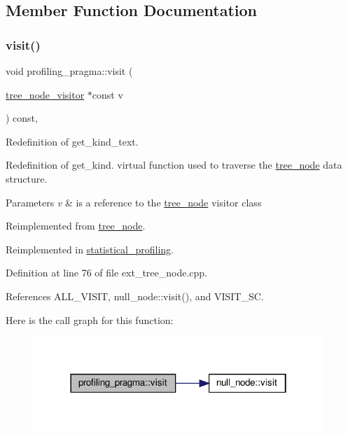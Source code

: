 \subsection{Member Function Documentation}
\mbox{\label{structprofiling__pragma_aa8bba94f73c0ad5b71140ac6fc79eb57}} 
\subsubsection{\texorpdfstring{visit()}{visit()}}
{\footnotesize\ttfamily void profiling\+\_\+pragma\+::visit (\begin{DoxyParamCaption}\item[{\hyperlink{classtree__node__visitor}{tree\+\_\+node\+\_\+visitor} $\ast$const}]{v }\end{DoxyParamCaption}) const\hspace{0.3cm}{\ttfamily [override]}, {\ttfamily [virtual]}}



Redefinition of get\+\_\+kind\+\_\+text. 

Redefinition of get\+\_\+kind. virtual function used to traverse the \hyperlink{classtree__node}{tree\+\_\+node} data structure. 
\begin{DoxyParams}{Parameters}
{\em v} & is a reference to the \hyperlink{classtree__node}{tree\+\_\+node} visitor class \\
\hline
\end{DoxyParams}


Reimplemented from \hyperlink{classtree__node_aa9abba3f1b30e0be80b4a56b188c6ecc}{tree\+\_\+node}.



Reimplemented in \hyperlink{structstatistical__profiling_a5f57274294fc3dc9e32ddeec86c8d3d0}{statistical\+\_\+profiling}.



Definition at line 76 of file ext\+\_\+tree\+\_\+node.\+cpp.



References A\+L\+L\+\_\+\+V\+I\+S\+IT, null\+\_\+node\+::visit(), and V\+I\+S\+I\+T\+\_\+\+SC.

Here is the call graph for this function\+:
\nopagebreak
\begin{figure}[H]
\begin{center}
\leavevmode
\includegraphics[width=310pt]{d9/d08/structprofiling__pragma_aa8bba94f73c0ad5b71140ac6fc79eb57_cgraph}
\end{center}
\end{figure}


